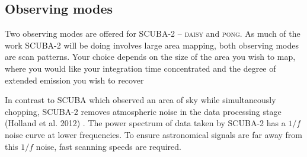 \documentclass[twoside,11pt]{article}
\newcommand{\xlabel}[1]{}
\renewcommand{\_}{\texttt{\symbol{95}}}
\begin{document}
\subsection{\xlabel{obs_modes}Observing modes}
\label{sec:mmodes}

Two observing modes are offered for SCUBA-2 -- \textsc{daisy} and
\textsc{pong}. As much of the work SCUBA-2 will be doing involves
large area mapping, both observing modes are scan patterns. Your
choice depends on the size of the area you wish to map, where you
would like your integration time concentrated and the degree of
extended emission you wish to recover

In contrast to SCUBA which observed an area of sky while
simultaneously chopping, SCUBA-2 removes atmospheric noise in the data
processing stage (Holland et al. 2012) \cite{s2main}. The power spectrum
of data taken by SCUBA-2 has a $1/f$ noise curve at lower frequencies. To
ensure astronomical signals are far away from this $1/f$ noise, fast
scanning speeds are required.
\end{document}
